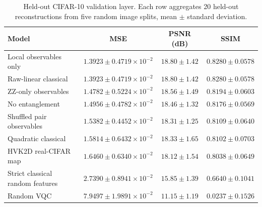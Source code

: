 \documentclass[11pt]{article}
\begin{document}
\begin{table}[H]
\centering
\caption{Held-out CIFAR-10 validation layer. Each row aggregates 20 held-out reconstructions from five random image splits, mean $\pm$ standard deviation.}
\label{tab:hvk_real_cifar}
\scriptsize
\begin{tabular}{lccc}
\toprule
Model & MSE & PSNR (dB) & SSIM \\
\midrule
Local observables only & $1.3923{\pm}0.4719\times10^{-2}$ & $18.80{\pm}1.42$ & $0.8280{\pm}0.0578$ \\
Raw-linear classical & $1.3923{\pm}0.4719\times10^{-2}$ & $18.80{\pm}1.42$ & $0.8280{\pm}0.0578$ \\
ZZ-only observables & $1.4782{\pm}0.5224\times10^{-2}$ & $18.56{\pm}1.49$ & $0.8194{\pm}0.0603$ \\
No entanglement & $1.4956{\pm}0.4782\times10^{-2}$ & $18.46{\pm}1.32$ & $0.8176{\pm}0.0569$ \\
Shuffled pair observables & $1.5382{\pm}0.4452\times10^{-2}$ & $18.31{\pm}1.25$ & $0.8109{\pm}0.0640$ \\
Quadratic classical & $1.5814{\pm}0.6432\times10^{-2}$ & $18.33{\pm}1.65$ & $0.8102{\pm}0.0703$ \\
HVK2D real-CIFAR map & $1.6460{\pm}0.6340\times10^{-2}$ & $18.12{\pm}1.54$ & $0.8038{\pm}0.0649$ \\
Strict classical random features & $2.7390{\pm}0.8941\times10^{-2}$ & $15.85{\pm}1.39$ & $0.6640{\pm}0.1041$ \\
Random VQC & $7.9497{\pm}1.9891\times10^{-2}$ & $11.15{\pm}1.19$ & $0.0237{\pm}0.1526$ \\
\bottomrule
\end{tabular}
\end{table}
\end{document}
